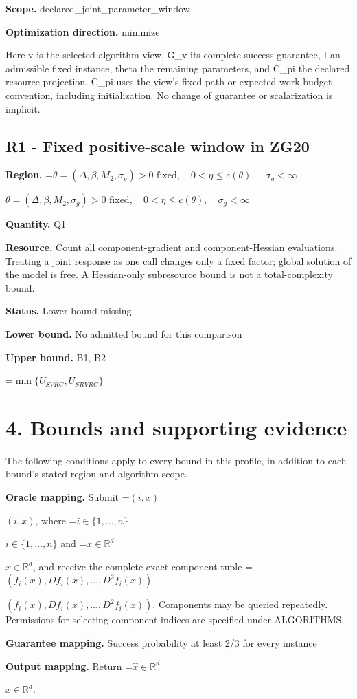 \documentclass[10pt,a4paper]{article}
\newcommand{\AtlasMath}[1]{\par\begingroup\centering\setbox0=\hbox{$\displaystyle #1$}\ifdim\wd0>1.4\linewidth\typeout{ATLAS WIDE FORMULA: \the\wd0}\fi\ifdim\wd0>\linewidth\resizebox{\linewidth}{!}{\box0}\else\box0\fi\par\endgroup}
\newcommand{\AtlasInlineMath}[1]{\begingroup\setbox0=\hbox{$#1$}\ifdim\wd0>.4\linewidth\endgroup\AtlasMath{#1}\else\endgroup$#1$\fi}
\begin{document}
\textbf{Scope.} declared\_joint\_parameter\_window

\textbf{Optimization direction.} minimize

Here v is the selected algorithm view, G\_v its complete success guarantee, I an admissible fixed instance, theta the remaining parameters, and C\_pi the declared resource projection. C\_pi uses the view's fixed-path or expected-work budget convention, including initialization. No change of guarantee or scalarization is implicit.

\subsection{R1 - Fixed positive-scale window in ZG20}
\textbf{Region.} \AtlasInlineMath{\theta=(\Delta,\beta,M_2,\sigma_g)>0\text{ fixed},\quad0<\eta\le c(\theta),\quad\sigma_g<\infty}

\textbf{Quantity.} Q1

\textbf{Resource.} Count all component-gradient and component-Hessian evaluations. Treating a joint response as one call changes only a fixed factor; global solution of the model is free. A Hessian-only subresource bound is not a total-complexity bound.

\textbf{Status.} Lower bound missing

\textbf{Lower bound.} No admitted bound for this comparison

\textbf{Upper bound.} B1, B2

\AtlasMath{\min\{U_{SVRC},U_{SRVRC}\}}
\section{4. Bounds and supporting evidence}
The following conditions apply to every bound in this profile, in addition to each bound's stated region and algorithm scope.

\textbf{Oracle mapping.} Submit \AtlasInlineMath{(i,x)}, where \AtlasInlineMath{i\in\{1,\ldots,n\}} and \AtlasInlineMath{x\in\mathbb{R}^d}, and receive the complete exact component tuple \AtlasInlineMath{(f_i(x),Df_i(x),\ldots,D^{2}f_i(x))}. Components may be queried repeatedly. Permissions for selecting component indices are specified under ALGORITHMS.

\textbf{Guarantee mapping.} Success probability at least 2/3 for every instance

\textbf{Output mapping.} Return \AtlasInlineMath{\widehat{x}\in \mathbb{R}^d}.
\end{document}
